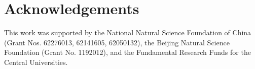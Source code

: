 \documentclass[10pt,journal,compsoc]{IEEEtran}
\begin{document}
\section*{Acknowledgements}
This work was supported by the National Natural Science Foundation of China (Grant Nos. 62276013, 62141605, 62050132), the Beijing Natural Science Foundation (Grant No. 1192012), and the Fundamental Research Funds for the Central Universities.




\end{document}
